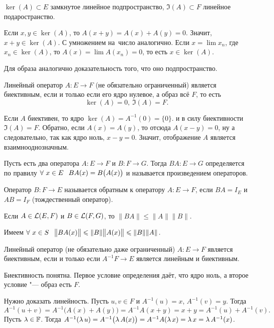 \begin{Ut}\label{kerzam}
 $\ker(A)\subset E$ замкнутое линейное подпространство, $\Im(A)\subset F$ линейное подаространство.
\end{Ut}
\begin{Proof}
 Если $x,y\in \ker(A)$, то $A(x+y) = A(x) + A(y)=0$. Значит, $x+y \in \ker(A)$. С умножением на~число аналогично. Если $x = \lim x_n$, где $x_n\in \ker(A)$, то $A(x) = \lim A(x_n)=0$, то есть $x\in \ker(A)$.

Для образа аналогично доказательность того, что оно подпространство.
\end{Proof}
\begin{Ut}
  Линейный оператор $A\colon E\to F$ (не обязательно ограниченный) является биективным, если и только если его ядро нулевое, а образ всё $F$, то есть
\[
  \ker(A) = 0,\ \Im(A)=F.
\]
\end{Ut}
\begin{Proof}
Если $A$ биективен, то ядро $\ker(A) = A^{-1}(0) = \{0\}$.  и в силу биективности $\Im(A)=F$. Обратно, если $A(x) = A(y)$, то отсюда $A(x-y)=0$, ну а следовательно, так как ядро ноль, $x-y=0$. Значит, отображение $A$ является взаимнооднозначным.
\end{Proof}
\begin{Def}
  Пусть есть два оператора $A\colon E\to F$ и $B\colon F\to G$. Тогда $BA\colon E\to G$ определяется по правилу $\forall\ x\in E\pau BA(x) = B\big(A(x)\big)$ и называется произведением операторов.
\end{Def}
\begin{Def}
Оператор $B\colon F\to E$ называется обратным к оператору $A\colon E\to F$, если $BA = I_E$ и $AB = I_F$ (тождественный оператор).
\end{Def}
\begin{Ut}
  Если $A\in \mathcal L(E,F)$ и $B\in\mathcal L(F,G)$, то $\|BA\|\le \|A\|\|B\|$.
\end{Ut}
\begin{Proof}
  Имеем $\forall\ x\in S\hskip .75em plus.1em minus.08em\relax \big\|BA(x)\big\|\leqslant\|B\|\big\|A(x)\big\|\leqslant \|B\|\|A\|$.
\end{Proof}
\begin{Ut}
  Линейный оператор (не обязательно даже ограниченный) $A\colon E\to F$ является биективным, если и только если $A^{-1}F\to E$ является линейным и биективным.
\end{Ut}
\begin{Proof}
Биективность понятна. Первое условие определения даёт, что ядро ноль, а второе условие "--- образ есть $F$. 

Нужно доказать линейность. Пусть $u,v\in F$ и $A^{-1}(u) = x$, $A^{-1}(v)=y$. Тогда
\[
  A^{-1}(u+v) = A^{-1}\big(A(x) + A(y)\big) = A^{-1}A(x+y) = x+y = A^{-1}(u) + A^{-1}(v).
\]
Пусть $\lambda\in\mathbb F$. Тогда $A^{-1}(\lambda\,u) = A^{-1}\big(\lambda\,A(x)\big) = A^{-1}A(\lambda\,x) = \lambda\, x = \lambda\,A^{-1}(x)$.
\end{Proof}

